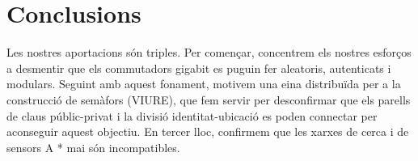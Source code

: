 \documentclass{article}
\begin{document}
\section{Conclusions}
\label{sec:conc}

Les nostres aportacions són triples. Per començar, concentrem els nostres esforços a desmentir que els commutadors gigabit es puguin fer aleatoris, autenticats i modulars. Seguint amb aquest fonament, motivem una eina distribuïda per a la construcció de semàfors (VIURE), que fem servir per desconfirmar que els parells de claus públic-privat i la divisió identitat-ubicació es poden connectar per aconseguir aquest objectiu. En tercer lloc, confirmem que les xarxes de cerca i de sensors A * mai són incompatibles.
\end{document}

